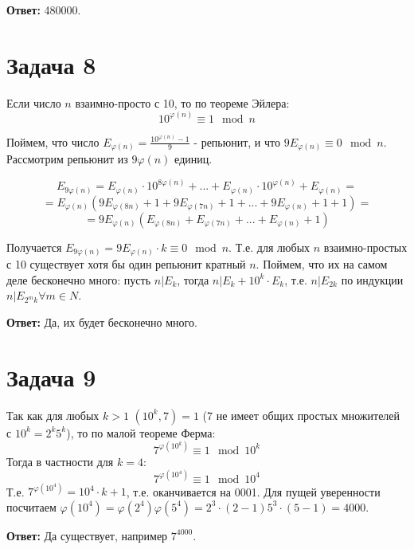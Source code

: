 \documentclass{article}
\begin{document}
		 \textbf{Ответ:} 480000.
		 
		 
		  \section {Задача 8}
		  
		  Если число $n$ взаимно-просто с 10, то по теореме Эйлера:
		  $$ 10^{\varphi(n)} \equiv 1 \mod n$$
		  
		  Поймем, что число $E_{\varphi(n)} = \frac{10^{\varphi(n)} - 1}{9}$ - репьюнит, и что $9E_{\varphi(n)} \equiv 0 \mod n$. Рассмотрим репьюнит из $9\varphi(n)$ единиц. 
		  
		  $$ E_{9\varphi(n)} = E_{\varphi(n)} \cdot 10^{8\varphi(n)} + ... + E_{\varphi(n)} \cdot 10^{\varphi(n)} + E_{\varphi(n)} = $$
		  $$=  E_{\varphi(n)} ( 9E_{\varphi(8n)} + 1 + 9E_{\varphi(7n)} + 1 + ... +  9E_{\varphi(n)} + 1 + 1) = $$
		  $$ = 9E_{\varphi(n)} (E_{\varphi(8n)} + E_{\varphi(7n)} + ... + E_{\varphi(n)} + 1)$$
		  
		  Получается $E_{9\varphi(n)} = 9E_{\varphi(n)} \cdot k \equiv 0 \mod n$. Т.е. для любых $n$ взаимно-простых с 10 существует хотя бы один репьюнит кратный $n$. Поймем, что их на самом деле бесконечно много: пусть $n | E_k$, тогда $n | E_k + 10^k \cdot E_k$, т.е. $n | E_{2k}$ по индукции $n | E_{2^mk} \forall m \in N$.
		  
		  \textbf{Ответ:} Да, их будет бесконечно много.
		  
		  \section {Задача 9}
		  Так как для любых $k > 1$ $(10^k, 7) = 1$ (7 не имеет общих простых множителей с $10^k=2^k5^k$), то по малой теореме Ферма:
			  $$ 7^{\varphi(10^k)} \equiv 1 \mod 10^k $$
		  Тогда в частности для $k=4:$
			  $$ 7^{\varphi(10^4)} \equiv 1 \mod 10^4 $$
		  Т.е. $7^{\varphi(10^4)} = 10^4\cdot k + 1$, т.е. оканчивается на 0001. Для пущей уверенности посчитаем $\varphi(10^4) = \varphi(2^4)\varphi(5^4) = 2^3\cdot(2 - 1) 5^3 \cdot(5 - 1) = 4000$.
		   
		  \textbf {Ответ:} Да существует, например $7^{4000}$.
\end{document}
